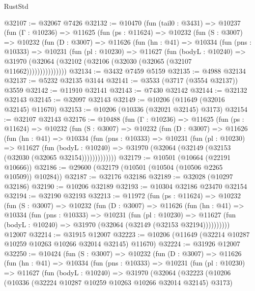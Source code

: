 \begin{lexlean}{RustStd}
\begin{coremodule}
@32107 := @32067 @7426
@32132 := @10470
    (fun (tail0 : @3431) =>
    @10237
      (fun (Γ : @10236) =>
      @11625
        (fun (ps : @11624) =>
        @10232
          (fun (S : @3007) =>
          @10232
            (fun (D : @3007) =>
            @11626
              (fun (hn : @41) =>
              @10334
                (fun (pns : @10333) =>
                @10231
                  (fun (pl : @10230) =>
                  @11627
                    (fun (bodyL : @10240) =>
                    @31970 (@32064 (@32102 (@32106 (@32030 (@32065 (@32107 @11662)))))))))))))))
@32134 := @3432 @7459 @5159
@32135 := @4988 @32134
@32137 := @5232 @32135 @3144
@32141 := @3533 (@3717 (@3554 @32137)) @3559
@32142 := @11910 @32141
@32143 := @7430 @32142
@32144 := @32132 @32143
@32145 := @32097 @32143
@32149 := @10206 (@11649 (@32016 @32145) @11670)
@32153 := @10206 (@10336 (@32021 @32145) @3173)
@32154 := @32107 @32143
@32176 := @10488
    (fun (Γ : @10236) =>
    @11625
      (fun (ps : @11624) =>
      @10232
        (fun (S : @3007) =>
        @10232
          (fun (D : @3007) =>
          @11626
            (fun (hn : @41) =>
            @10334
              (fun (pns : @10333) =>
              @10231
                (fun (pl : @10230) =>
                @11627
                  (fun (bodyL : @10240) =>
                  @31970 (@32064 (@32149 (@32153 (@32030 (@32065 @32154)))))))))))))
@32179 := @10501 (@10664 (@22191 @10666))
@32186 := @29600 (@32179 (@10501 (@10504 (@10506 @2265 @10509)) @10284))
@32187 := @32176 @32186
@32189 := @32028 (@10297 @32186)
@32190 := @10206 @32189
@32193 := @10304 @32186 @23470 @32154
@32194 := @32190 @32193
@32213 := @11972
    (fun (ps : @11624) =>
    @10232
      (fun (S : @3007) =>
      @10232
        (fun (D : @3007) =>
        @11626
          (fun (hn : @41) =>
          @10334
            (fun (pns : @10333) =>
            @10231
              (fun (pl : @10230) =>
              @11627 (fun (bodyL : @10240) => @31970 (@32064 (@32149 (@32153 @32194))))))))))
    @12007
@32214 := @31915 @12007
@32223 := @10206 (@11649 (@32214 @10287 @10259 @10263 @10266 @32014 @32145) @11670)
@32224 := @31926 @12007
@32250 := @10424
    (fun (S : @3007) =>
    @10232
      (fun (D : @3007) =>
      @11626
        (fun (hn : @41) =>
        @10334
          (fun (pns : @10333) =>
          @10231
            (fun (pl : @10230) =>
            @11627
              (fun (bodyL : @10240) =>
              @31970
                (@32064
                  (@32223
                    (@10206
                      (@10336 (@32224 @10287 @10259 @10263 @10266 @32014 @32145) @3173)

\end{coremodule}
\end{lexlean}
